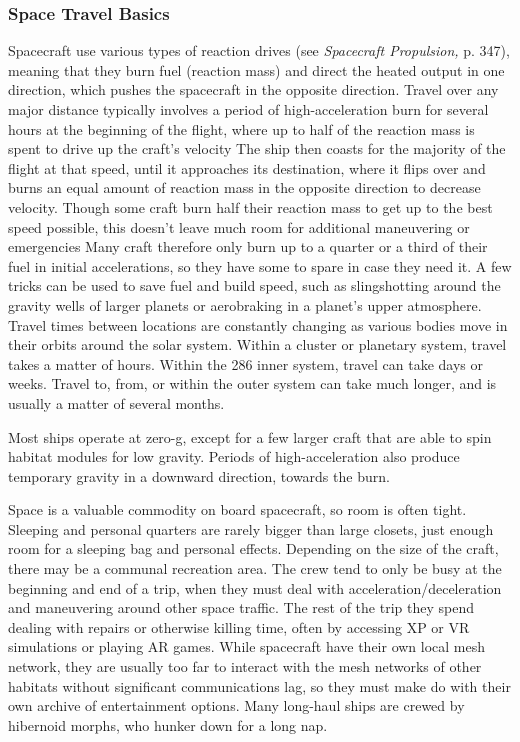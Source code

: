 \subsubsection{Space Travel Basics} 

Spacecraft use various types of reaction drives (see \textit{Spacecraft Propulsion,} p. 347), meaning that they burn fuel (reaction mass) and direct the heated output in one direction, which pushes the spacecraft in the opposite direction. Travel over any major distance typically involves a period of high-acceleration burn for several hours at the beginning of the flight, where up to half of the reaction mass is spent to drive up the craft's velocity The ship then coasts for the majority of the flight at that speed, until it approaches its destination, where it flips over and burns an equal amount of reaction mass in the opposite direction to decrease velocity. Though some craft burn half their reaction mass to get up to the best speed possible, this doesn't leave much room for additional maneuvering or emergencies Many craft therefore only burn up to a quarter or a third of their fuel in initial accelerations, so they have some to spare in case they need it. A few tricks can be used to save fuel and build speed, such as slingshotting around the gravity wells of larger planets or aerobraking in a planet's upper atmosphere. Travel times between locations are constantly changing as various bodies move in their orbits around the solar system. Within a cluster or planetary system, travel takes a matter of hours. Within the 286 inner system, travel can take days or weeks. Travel to, from, or within the outer system can take much longer, and is usually a matter of several months. 

Most ships operate at zero-g, except for a few larger craft that are able to spin habitat modules for low gravity. Periods of high-acceleration also produce temporary gravity in a downward direction, towards the burn. 

Space is a valuable commodity on board spacecraft, so room is often tight. Sleeping and personal quarters are rarely bigger than large closets, just enough room for a sleeping bag and personal effects. Depending on the size of the craft, there may be a communal recreation area. The crew tend to only be busy at the beginning and end of a trip, when they must deal with acceleration/deceleration and maneuvering around other space traffic. The rest of the trip they spend dealing with repairs or otherwise killing time, often by accessing XP or VR simulations or playing AR games. While spacecraft have their own local mesh network, they are usually too far to interact with the mesh networks of other habitats without significant communications lag, so they must make do with their own archive of entertainment options. Many long-haul ships are crewed by hibernoid morphs, who hunker down for a long nap. 

